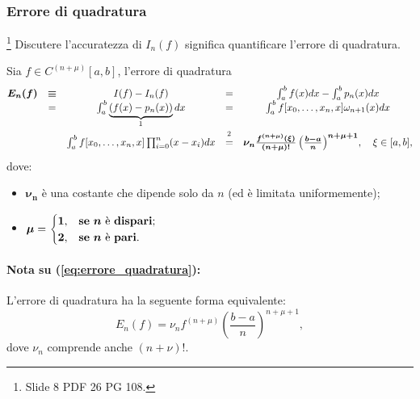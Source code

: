 \subsubsection{Errore di quadratura}
\footnote{Slide 8 PDF 26 PG 108.} Discutere l'accuratezza di $I_n(f)$ significa quantificare l'errore di quadratura.
\begin{definition}
	Sia $f\in C^{(n+\mu)}[a,b]$, l'errore di quadratura 
	\begin{equation}\label{eq:errore_quadratura}
	    \begin{matrix}
	        \boldsymbol{E_n(f)}&\boldsymbol{\equiv}& I(f)-I_n(f)&=&\int_a^b f(x)dx-\int_a^bp_n(x)dx\\
	        &=&\int_a^b\underbrace{(f(x)-p_n(x))}_{\footnotemark}dx&=&\int_a^bf[x_0,\hdots,x_n,x]\omega_{n+1}(x)dx\\
	        &&\int_a^bf[x_0,\hdots,x_n,x]\prod_{i=0}^n(x-x_i)dx&\overset{\footnotemark}{=}&\boldsymbol{\nu_n \frac{f^{(n+\mu)}(\xi)}{(n+\mu)!}\left(\frac{b-a}{n}\right)^{n+\mu+1}},\quad\xi\in [a,b],
	    \end{matrix}
	\end{equation}
	\noindent dove:
	\begin{itemize}
		\item $\boldsymbol{\nu_n}$ è una costante che dipende solo da $n$ (ed è limitata uniformemente);
		\item $\boldsymbol{\mu}=
		\begin{cases}
			\boldsymbol 1, &\text{\textbf{se} $\boldsymbol n$ è \textbf{dispari};}\\
			\boldsymbol 2, &\text{\textbf{se} $\boldsymbol n$ è \textbf{pari}.}
		\end{cases}$
	\end{itemize}
\end{definition}
\addtocounter{footnote}{-1}


\paragraph{Nota su (\ref{eq:errore_quadratura}):} L'errore di quadratura ha la seguente forma equivalente:
\begin{equation*}
	E_n(f) = \nu_n f^{(n+\mu)}\left(\frac{b-a}{n}\right)^{n+\mu+1},
\end{equation*}
dove $\nu_n$ comprende anche $(n + \nu)!$.

